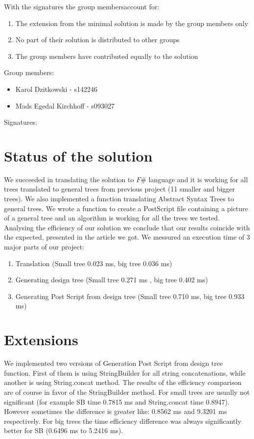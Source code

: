 \documentclass[12pt]{article}
\begin{document}
\maketitle
\setlength{\parindent}{0pt}
With the signatures the group membersaccount for:
\begin{enumerate}
\item The extension from the minimal solution is made by the group
members only
\item No part of their solution is distributed to other groups
\item The group members have contributed equally to the solution
\end{enumerate}
Group members:
\begin{itemize}
\item Karol Dzitkowski - s142246
\item Mads Egedal Kirchhoff - s093027
\end{itemize}
Signatures:
\clearpage

\section{Status of the solution}
We succeeded in translating the solution to $F\#$ language and it is working for all trees translated 
to general trees from previous project (11 smaller and bigger trees). We also implemented a function
translating Abstract Syntax Trees to general trees. We wrote a function to create a PostScript file
containing a picture of a general tree and an algorithm is working for all the trees we tested. 
Analysing the efficiency of our solution we conclude that our results coincide with the expected, presented
in the article we got. We messured an execution time of 3 major parts of our project:
\begin{enumerate}
\item Translation (Small tree 0.023 ms, big tree 0.036 ms)
\item Generating design tree (Small tree 0.271 ms , big tree 0.402 ms)
\item Generating Post Script from design tree (Small tree 0.710 ms, big tree 0.933 ms) 
\end{enumerate}

\section{Extensions}
We implemented two versions of Generation Post Script from design tree function. First of them is 
using StringBuilder for all string concatenations, while another is using String.concat method. The
results of the efficiency comparison are of course in favor of the StringBuilder method. For small trees
are usually not significant (for example SB time 0.7815 ms and String.concat time 0.8947). However
sometimes the difference is greater like: 0.8562 ms and 9.3201 ms respectively. For big trees the time
efficiency difference was always significantly better for SB (0.6496 ms to 5.2416 ms).
\end{document}
